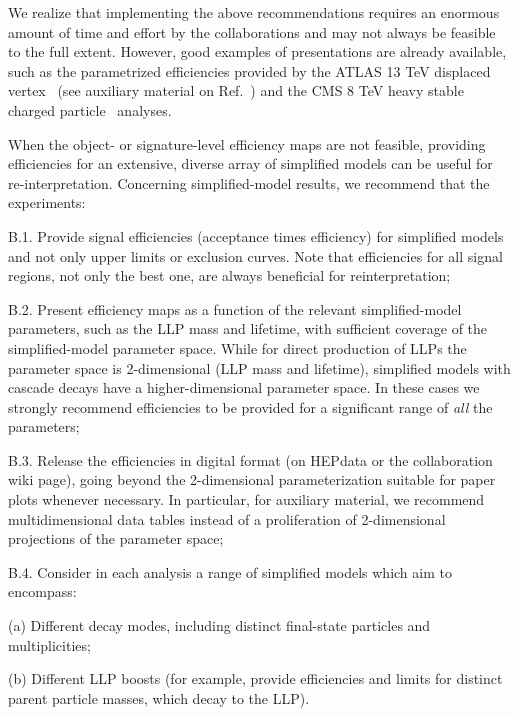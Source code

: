 \noindent
%
We realize that implementing the above recommendations requires an enormous amount of time and effort by
the collaborations and may not  always be feasible to the full extent.
However, good examples of presentations are already available, such as
the parametrized efficiencies provided by the ATLAS 13 TeV displaced
vertex~\cite{Aaboud:2017iio} (see auxiliary material on Ref.~\cite{SUSY-2016-08}) and the CMS 8 TeV heavy stable
charged particle~\cite{Khachatryan:2015lla} analyses.

When the object- or signature-level efficiency maps are not feasible, providing efficiencies for an extensive, diverse array of simplified models can be
useful for re-interpretation.
Concerning simplified-model results, we recommend that the experiments:
\begin{description*}
  \item[B.1.] Provide signal efficiencies  (acceptance times efficiency) for
  simplified models and not only upper limits or exclusion curves.
  Note that efficiencies for all signal regions, not only the best one, are always beneficial for reinterpretation;
  \item[B.2.] Present efficiency maps as a function of the relevant simplified-model parameters, such as the LLP mass and lifetime, with sufficient coverage of the simplified-model parameter space. While for direct production of LLPs the parameter space is 2-dimensional
  (LLP mass and lifetime), simplified models with cascade decays have a higher-dimensional parameter space. In these cases we strongly recommend
  efficiencies to be provided for a significant range of {\it all} the
  parameters;
  \item[B.3.] Release the efficiencies in digital format (on HEPdata or the collaboration wiki page), going beyond the 2-dimensional parameterization suitable for paper plots whenever necessary. In particular, for auxiliary material, we recommend multidimensional data tables instead of a proliferation of 2-dimensional projections
  of the parameter space;
  \item[B.4.] Consider in each analysis  a range of simplified models which aim to encompass:
\begin{description*}
    \item[(a)] Different decay modes, including distinct final-state particles and multiplicities;
    \item[(b)] Different LLP boosts (for example, provide efficiencies and limits
        for distinct parent particle masses, which decay to the LLP).
\end{description*}
\end{description*}

